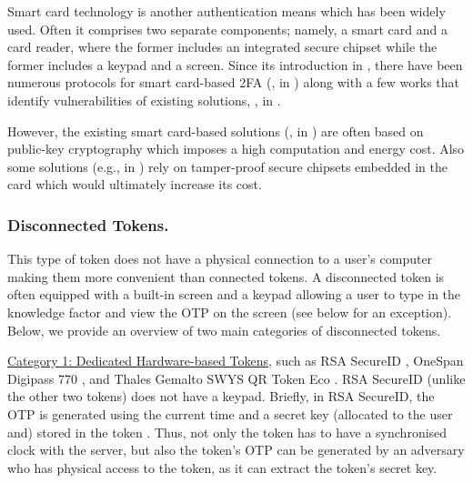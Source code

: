 Smart card technology is another authentication means which has been widely used. Often it comprises two separate components; namely, a smart card and a card reader, where the former includes an integrated secure chipset while the former includes a keypad and a screen. Since its introduction in \cite{chang1991remote}, there have been numerous protocols for smart card-based 2FA (\eg, in \cite{gupta2021machine,WangW18,radhakrishnan2022dependable}) along with a few works that identify vulnerabilities of existing solutions, \eg, in \cite{TianLHL20,WangGCW16,ChaturvediDMM16}. 

However, the existing smart card-based solutions (\eg, in \cite{gupta2021machine,WangW18,radhakrishnan2022dependable}) are often based on public-key cryptography which imposes a high computation and energy cost. Also some solutions (e.g., in \cite{kim2009more}) rely on tamper-proof secure chipsets embedded in the card which would ultimately increase its cost. 







\subsubsection{Disconnected Tokens.}

This type of token does not have a physical connection to a user's computer making them more convenient than connected tokens. A disconnected token is often equipped with a built-in screen and a keypad allowing a user to type in the knowledge factor and view the OTP on the screen (see below for an exception).  Below, we provide an overview of two main categories of disconnected tokens.




\underline{Category 1: Dedicated Hardware-based Tokens}, such as RSA SecureID \cite{secureID}, OneSpan Digipass 770 \cite{Digipass-website}, and Thales Gemalto SWYS QR Token Eco \cite{Gemalto}.   RSA SecureID (unlike the other two tokens) does not have a keypad. Briefly, in RSA SecureID, the OTP is generated using the current time and a secret key (allocated to the user and) stored in the token \cite{biryukov2003cryptanalysis}. Thus, not only the token has to have a synchronised clock with the server, but also the token's OTP can be generated by an adversary who has physical access to the token, as it can extract the token's secret key.  

